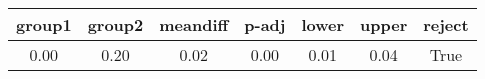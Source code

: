 \begin{tabular}{|c|c|c|c|c|c|c|}
\toprule
 group1 &  group2 &  meandiff &  p-adj &  lower &  upper &  reject \\
\midrule
   0.00 &    0.20 &      0.02 &   0.00 &   0.01 &   0.04 &    True \\
\bottomrule
\end{tabular}
